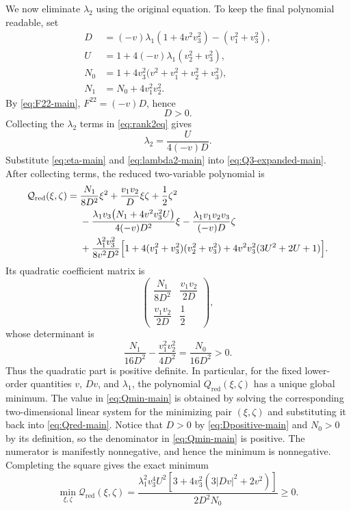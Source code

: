 \documentclass{article}
\numberwithin{equation}{section}
\begin{document}
We now eliminate $\lambda_2$ using the original equation. To keep the final polynomial readable, set
\begin{align}
D&=(-v)\lambda_1(1+4v^2v_3^2)-(v_1^2+v_3^2),
\label{eq:Dmain}\\
U&=1+4(-v)\lambda_1(v_2^2+v_3^2),
\label{eq:Umain}\\
N_0&=1+4v_3^2\bigl(v^2+v_1^2+v_2^2+v_3^2\bigr),
\label{eq:N0main}\\
N_1&=N_0+4v_1^2v_2^2.
\label{eq:N1main}
\end{align}
By \eqref{eq:F22-main}, $F^{22}=(-v)D$, hence
\begin{equation}\label{eq:Dpositive-main}
D>0.
\end{equation}
Collecting the $\lambda_2$ terms in \eqref{eq:rank2eq} gives
\begin{equation}\label{eq:lambda2-main}
\lambda_2=\frac{U}{4(-v)D}.
\end{equation}
Substitute \eqref{eq:eta-main} and \eqref{eq:lambda2-main} into \eqref{eq:Q3-expanded-main}. After collecting terms, the reduced two-variable polynomial is
\begin{align}
\mathcal Q_{\mathrm{red}}(\xi,\zeta)
={}&\frac{N_1}{8D^2}\xi^2
+\frac{v_1v_2}{D}\xi\zeta
+\frac12\zeta^2
\notag\\
&-\frac{\lambda_1v_3\bigl(N_1+4v^2v_3^2U\bigr)}{4(-v)D^2}\xi
-\frac{\lambda_1v_1v_2v_3}{(-v)D}\zeta
\notag\\
&+\frac{\lambda_1^2v_3^2}{8v^2D^2}
\Bigl[
1+4(v_1^2+v_3^2)(v_2^2+v_3^2)
+4v^2v_3^2(3U^2+2U+1)
\Bigr].
\label{eq:Qred-main}
\end{align}
Its quadratic coefficient matrix is
\begin{equation}\label{eq:Hmatrix-main}
\begin{pmatrix}
\dfrac{N_1}{8D^2}&\dfrac{v_1v_2}{2D}\\[2mm]
\dfrac{v_1v_2}{2D}&\dfrac12
\end{pmatrix},
\end{equation}
whose determinant is
\begin{equation}\label{eq:Hdet-main}
\frac{N_1}{16D^2}-\frac{v_1^2v_2^2}{4D^2}
=\frac{N_0}{16D^2}>0.
\end{equation}
Thus the quadratic part is positive definite.  In particular, for the fixed lower-order quantities
\(v\), \(Dv\), and \(\lambda_1\), the polynomial
\(Q_{\mathrm{red}}(\xi,\zeta)\) has a unique global minimum.
The value in \eqref{eq:Qmin-main} is obtained by solving the corresponding
two-dimensional linear system for the minimizing pair
\((\xi,\zeta)\) and substituting it back into \eqref{eq:Qred-main}.
Notice that \(D>0\) by \eqref{eq:Dpositive-main} and \(N_0>0\) by its definition, so
the denominator in \eqref{eq:Qmin-main}  is positive. The numerator is manifestly
nonnegative, and hence the minimum is nonnegative. Completing the square gives the exact minimum
\begin{equation}\label{eq:Qmin-main}
\min_{\xi,\zeta}\mathcal{Q}_{\mathrm{red}}(\xi,\zeta)
=
\frac{
\lambda_1^2v_3^4U^2
\left[3+4v_3^2\left(3|Dv|^2+2v^2\right)\right]
}{
2D^2N_0
}
\ge 0.
\end{equation}
\end{document}
